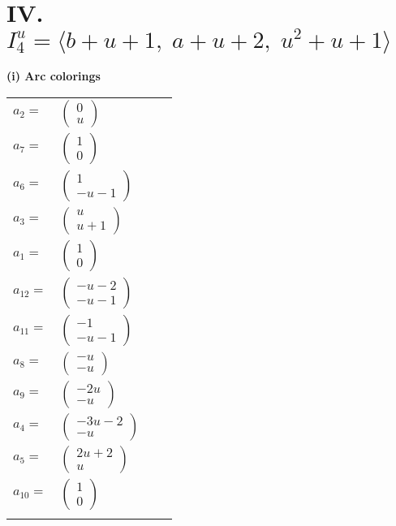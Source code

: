 \documentclass[1p]{elsarticle_modified}
\theoremstyle{definition}
\begin{document}
\centering \section*{IV. $I^u_{4}= \langle b+u+1,\;a+u+2,\;u^2+u+1 \rangle$}
\flushleft \textbf{(i) Arc colorings}\\
\begin{tabular}{m{7pt} m{180pt} m{7pt} m{180pt} }
\flushright $a_{2}=$&$\begin{pmatrix}0\\u\end{pmatrix}$ \\
\flushright $a_{7}=$&$\begin{pmatrix}1\\0\end{pmatrix}$ \\
\flushright $a_{6}=$&$\begin{pmatrix}1\\- u-1\end{pmatrix}$ \\
\flushright $a_{3}=$&$\begin{pmatrix}u\\u+1\end{pmatrix}$ \\
\flushright $a_{1}=$&$\begin{pmatrix}1\\0\end{pmatrix}$ \\
\flushright $a_{12}=$&$\begin{pmatrix}- u-2\\- u-1\end{pmatrix}$ \\
\flushright $a_{11}=$&$\begin{pmatrix}-1\\- u-1\end{pmatrix}$ \\
\flushright $a_{8}=$&$\begin{pmatrix}- u\\- u\end{pmatrix}$ \\
\flushright $a_{9}=$&$\begin{pmatrix}-2 u\\- u\end{pmatrix}$ \\
\flushright $a_{4}=$&$\begin{pmatrix}-3 u-2\\- u\end{pmatrix}$ \\
\flushright $a_{5}=$&$\begin{pmatrix}2 u+2\\u\end{pmatrix}$ \\
\flushright $a_{10}=$&$\begin{pmatrix}1\\0\end{pmatrix}$\\&\end{tabular}
\end{document}

